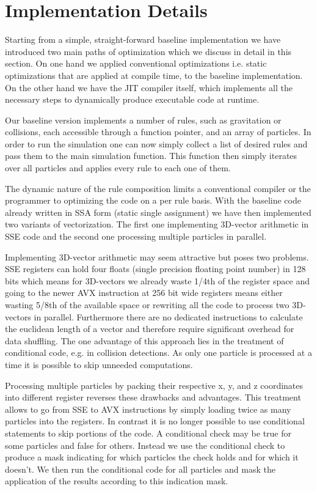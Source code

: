 \section{Implementation Details}\label{sec:method}

Starting from a simple, straight-forward baseline implementation we have introduced two main paths of optimization which we discuss in detail in this section. On one hand we applied conventional optimizations i.e. static optimizations that are applied at compile time, to the baseline implementation. On the other hand we have the JIT compiler itself, which implements all the necessary steps to dynamically produce executable code at runtime.

Our baseline version implements a number of rules, such as gravitation or collisions, each accessible through a function pointer, and an array of particles. In order to run the simulation one can now simply collect a list of desired rules and pass them to the main simulation function. This function then simply iterates over all particles and applies every rule to each one of them.

The dynamic nature of the rule composition limits a conventional compiler or the programmer to optimizing the code on a per rule basis. With the baseline code already written in SSA form (static single assignment) we have then implemented two variants of vectorization. The first one implementing 3D-vector arithmetic in SSE code and the second one processing multiple particles in parallel.

Implementing 3D-vector arithmetic may seem attractive but poses two problems. SSE registers can hold four floats (single precision floating point number) in 128 bits which means for 3D-vectors we already waste 1/4th of the register space and going to the newer AVX instruction at 256 bit wide registers means either wasting 5/8th of the available space or rewriting all the code to process two 3D-vectors in parallel. Furthermore there are no dedicated instructions to calculate the euclidean length of a vector and therefore require significant overhead for data shuffling. The one advantage of this approach lies in the treatment of conditional code, e.g. in collision detections. As only one particle is processed at a time it is possible to skip unneeded computations.

Processing multiple particles by packing their respective x, y, and z coordinates into different register reverses these drawbacks and advantages. This treatment allows to go from SSE to AVX instructions by simply loading twice as many particles into the registers. In contrast it is no longer possible to use conditional statements to skip portions of the code. A conditional check may be true for some particles and false for others. Instead we use the conditional check to produce a mask indicating for which particles the check holds and for which it doesn't. We then run the conditional code for all particles and mask the application of the results according to this indication mask.

